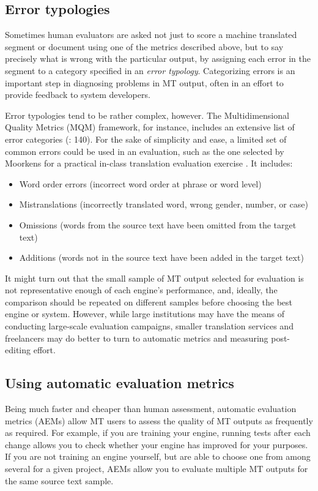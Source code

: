 \documentclass[output=paper]{langscibook}
\begin{document}
\subsection{Error typologies}

Sometimes human evaluators are asked not just to score a machine translated segment or document using one of the metrics described above, but to say precisely what is wrong with the particular output, by assigning each error in the segment to a category specified in an \textit{error typology}. Categorizing errors is an important step in diagnosing problems in MT output, often in an effort to provide feedback to system developers.

Error typologies tend to be rather complex, however. The Multidimensional Quality Metrics (MQM) framework, for instance, includes an extensive list of error categories (\citealt{MarianaMelby2015}: 140). For the sake of simplicity and ease, a limited set of common errors could be used in an evaluation, such as the one selected by Moorkens for a practical in-class translation evaluation exercise \citep[380]{Moorkens2018}. It includes:

\begin{itemize}
\item Word order errors (incorrect word order at phrase or word level)
\item Mistranslations (incorrectly translated word, wrong gender, number, or case)
\item Omissions (words from the source text have been omitted from the target text)
\item Additions (words not in the source text have been added in the target text)
\end{itemize}

It might turn out that the small sample of MT output selected for evaluation is not representative enough of each engine’s performance, and, ideally, the comparison should be repeated on different samples before choosing the best engine or system. However, while large institutions may have the means of conducting large-scale evaluation campaigns, smaller translation services and freelancers may do better to turn to automatic metrics and measuring post-editing effort.

\subsection{Using automatic evaluation metrics}

Being much faster and cheaper than human assessment, automatic evaluation metrics (AEMs) allow MT users to assess the quality of MT outputs as frequently as required. For example, if you are training your engine, running tests after each change allows you to check whether your engine has improved for your purposes. If you are not training an engine yourself, but are able to choose one from among several for a given project, AEMs allow you to evaluate multiple MT outputs for the same source text sample.
\end{document}
